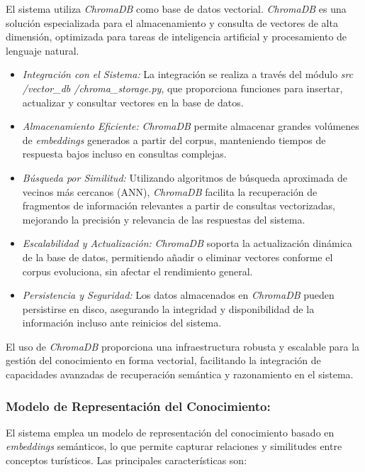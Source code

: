 \documentclass[10pt]{llncs}
\begin{document}
El sistema utiliza \textit{ChromaDB} como base de datos vectorial. \textit{ChromaDB} es una solución 
especializada para el almacenamiento y consulta de vectores de alta dimensión, optimizada para tareas de inteligencia artificial y procesamiento de lenguaje natural.

\begin{itemize}
    \item \textit{Integración con el Sistema:} La integración se realiza a través del módulo \newline\textit{src /vector\_db /chroma\_storage.py}, que proporciona funciones para insertar, actualizar y consultar vectores en la base de datos.
    \item \textit{Almacenamiento Eficiente:} \textit{ChromaDB} permite almacenar grandes volúmenes de \textit{embeddings} generados a partir del corpus, manteniendo tiempos de respuesta bajos incluso en consultas complejas.
    \item \textit{Búsqueda por Similitud:} Utilizando algoritmos de búsqueda aproximada de vecinos más cercanos (ANN), \textit{ChromaDB} facilita la recuperación de fragmentos de información relevantes a partir de consultas vectorizadas, mejorando la precisión y relevancia de las respuestas del sistema.
    \item \textit{Escalabilidad y Actualización:} \textit{ChromaDB} soporta la actualización dinámica de la base de datos, permitiendo añadir o eliminar vectores conforme el corpus evoluciona, sin afectar el rendimiento general.
    \item \textit{Persistencia y Seguridad:} Los datos almacenados en \textit{ChromaDB} pueden persistirse en disco, asegurando la integridad y disponibilidad de la información incluso ante reinicios del sistema.
\end{itemize}

El uso de \textit{ChromaDB} proporciona una infraestructura robusta y escalable para la gestión del conocimiento en forma vectorial, facilitando la integración de capacidades avanzadas de recuperación semántica y razonamiento en el sistema.

\subsubsection{Modelo de Representación del Conocimiento:}

El sistema emplea un modelo de representación del conocimiento basado en \textit{embeddings} semánticos, lo que permite capturar relaciones y similitudes entre conceptos turísticos. Las principales características son:
\end{document}
